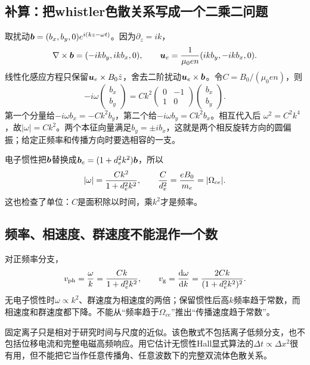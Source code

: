 \subsection{补算：把whistler色散关系写成一个二乘二问题}
取扰动$\bm{b}=(b_x,b_y,0)e^{i(kz-\omega t)}$。因为$\partial_z=ik$，
\begin{equation}
 \nabla\times\bm{b}=(-ikb_y,ikb_x,0),\qquad
 \bm{u}_e={1\over\mu_0en}(ikb_y,-ikb_x,0).
\end{equation}
线性化感应方程只保留$\bm{u}_e\times B_0\hat z$，舍去二阶扰动$\bm{u}_e\times\bm{b}$。令$C=B_0/(\mu_0en)$，则
\begin{equation}
 -i\omega
 \begin{pmatrix}b_x\\b_y\end{pmatrix}
 =Ck^2
 \begin{pmatrix}0&-1\\1&0\end{pmatrix}
 \begin{pmatrix}b_x\\b_y\end{pmatrix}.
\end{equation}
第一个分量给$-i\omega b_x=-Ck^2b_y$，第二个给$-i\omega b_y=Ck^2b_x$。相互代入后
$\omega^2=C^2k^4$，故$|\omega|=Ck^2$。两个本征向量满足$b_y=\pm i b_x$，这就是两个相反旋转方向的圆偏振；给定正频率和传播方向时要选相容的一支。

电子惯性把$\bm{b}$替换成$\bm{b}_e=(1+d_e^2k^2)\bm{b}$，所以
\begin{equation}
 |\omega|={Ck^2\over1+d_e^2k^2},\qquad
 {C\over d_e^2}={eB_0\over m_e}=|\Omega_{ce}|.
\end{equation}
这也检查了单位：$C$是面积除以时间，乘$k^2$才是频率。

\subsection{频率、相速度、群速度不能混作一个数}
对正频率分支，
\begin{equation}
 v_{\rm ph}={\omega\over k}={Ck\over1+d_e^2k^2},\qquad
 v_{\rm g}={\mathrm d\omega\over\mathrm d k}
 ={2Ck\over(1+d_e^2k^2)^2}.
\end{equation}
无电子惯性时$\omega\propto k^2$、群速度为相速度的两倍；保留惯性后高$k$频率趋于常数，而相速度和群速度都下降。不能从“频率趋于$\Omega_{ce}$”推出“传播速度趋于常数”。

固定离子只是相对于研究时间与尺度的近似。该色散式不包括离子低频分支，也不包括位移电流和完整电磁高频响应。用它估计无惯性Hall显式算法的$\Delta t\propto\Delta x^2$很有用，但不能把它当作任意传播角、任意波数下的完整双流体色散关系。
